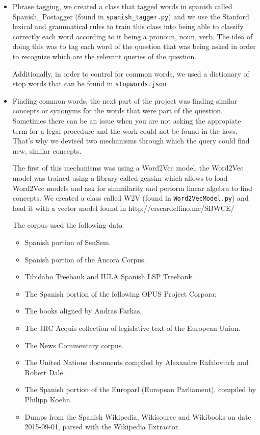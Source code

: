 \documentclass[letterpaper, margin=1in]{article}
\begin{document}
\begin{itemize} 

\item Phrase tagging, we created a class that tagged words in spanish called Spanish_Postagger (found in \texttt{spanish_tagger.py}) and we use the Stanford lexical and grammatical rules to train this class into being able to classify correctly each word according to it being a pronoun, noun, verb. The idea of doing this was to tag each word of the question that was being asked in order to recognize which are the relevant queries of the question. 

Additionally, in order to control for common words, we used a dictionary of stop words  that can be found in \texttt{stopwords.json}

\item Finding common words, the next part of the project was finding similar
concepts or synonyms for the words that were part of the question. Sometimes
there can be an issue when you are not asking the appropiate term for a legal
procedure and the work could not be found in the laws. That's why we devised
two mechanisms through which the query could find new, similar concepts. 

The first of this mechanisms was using a Word2Vec model, the Word2Vec model
was trained using a library called gensim which allows to load Word2Vec models and ask for simmilarity and perform linear algebra to find concepts.
We created a class called W2V (found in \texttt{Word2VecModel.py}) and load it with a vector model found in http://crscardellino.me/SBWCE/

The corpus used the following data

\begin{itemize} 
\item Spanish portion of SenSem.
\item Spanish portion of the Ancora Corpus.
\item Tibidabo Treebank and IULA Spanish LSP Treebank.
\item The Spanish portion of the following OPUS Project Corpora:
\item The books aligned by Andras Farkas.
\item The JRC-Acquis collection of legislative text of the European Union.
\item The News Commentary corpus.
\item The United Nations documents compiled by Alexandre Rafalovitch and Robert Dale.
\item The Spanish portion of the Europarl (European Parliament), compiled by Philipp Koehn.
\item Dumps from the Spanish Wikipedia, Wikisource and Wikibooks on date 2015-09-01, parsed with the Wikipedia Extractor.
\end{itemize} 


\end{itemize}
\end{document}
